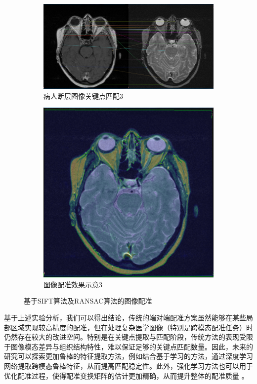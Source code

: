 \documentclass[a4paper, utf8]{ctexart}
\begin{document}
\begin{figure}[htbp]
		\begin{subfigure}{.6\textwidth}
			\centering
			\includegraphics[height=.13\textheight]{./figure/match_opencv_3.png}
			\caption{病人断层图像关键点匹配3}
		\end{subfigure}
		\begin{subfigure}{.3\textwidth}
			\centering
			\includegraphics[height=.13\textheight]{./figure/compare_opencv_3.png}
			\caption{图像配准效果示意3}
		\end{subfigure}
		
		\caption{基于SIFT算法及RANSAC算法的图像配准}
	\end{figure}
	
	基于上述实验分析，我们可以得出结论，传统的端对端配准方案虽然能够在某些局部区域实现较高精度的配准，但在处理复杂医学图像（特别是跨模态配准任务）时仍然存在较大的改进空间。特别是在关键点提取与匹配阶段，传统方法的表现受限于图像模态差异与组织结构特性，难以保证足够的关键点匹配数量。因此，未来的研究可以探索更加鲁棒的特征提取方法，例如结合基于学习的方法，通过深度学习网络提取跨模态鲁棒特征，从而提高匹配稳定性。此外，强化学习方法也可以用于优化配准过程，使得配准变换矩阵的估计更加精确，从而提升整体的配准质量 \cite{reg}。
	
\end{document}
